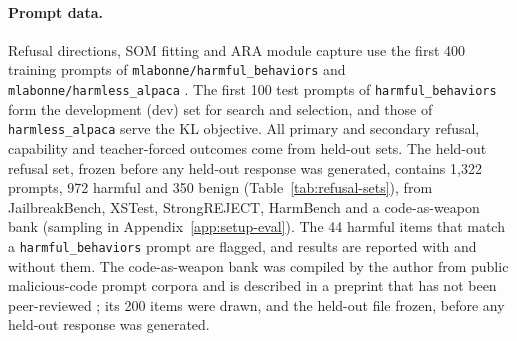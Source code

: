 \paragraph{Prompt data.} Refusal directions, SOM fitting and ARA module
capture use the first 400 training prompts of
\texttt{mlabonne/harmful\_behaviors} and \texttt{mlabonne/harmless\_alpaca}
\cite{zou2023universal,taori2023alpaca}. The first 100 test prompts of
\texttt{harmful\_behaviors} form the development (dev) set for search and
selection, and those of \texttt{harmless\_alpaca} serve the KL objective.
All primary and secondary refusal, capability and teacher-forced outcomes come
from held-out sets. The held-out refusal set, frozen before any held-out response was generated,
contains 1{,}322 prompts, 972 harmful and 350 benign
(Table~\ref{tab:refusal-sets}), from JailbreakBench, XSTest, StrongREJECT,
HarmBench and a code-as-weapon bank
\cite{chao2024jailbreakbench,rottger2024xstest,souly2024strongreject,mazeika2024harmbench,young2026code}
(sampling in Appendix~\ref{app:setup-eval}). The 44 harmful
items that match a \texttt{harmful\_behaviors} prompt are flagged, and results
are reported with and without them. The code-as-weapon bank was compiled by the
author from public malicious-code prompt corpora and is described in a preprint
that has not been peer-reviewed \cite{young2026code}; its 200 items were drawn,
and the held-out file frozen, before any held-out response was generated.

